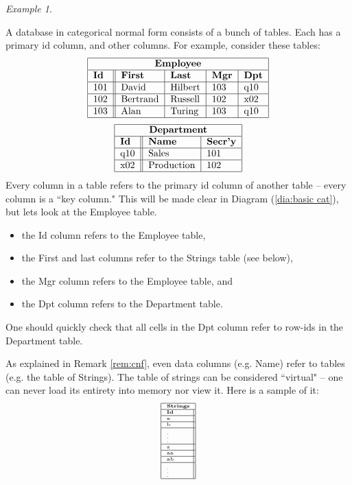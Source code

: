 \documentclass{amsart}
\theoremstyle{remark}
\newtheorem{example}[theorem]{Example}
\theoremstyle{definition}
\begin{document}
\begin{example}\label{ex:basic}

A database in categorical normal form consists of a bunch of tables.  Each has a primary id column, and other columns.  For example, consider these tables: \begin{align}\label{dia:flb}\begin{tabular}{| l || l | l | l | l |}\hline\multicolumn{5}{| c |}{\bf Employee}\\\hline {\bf Id}&{\bf First}&{\bf Last}&{\bf Mgr}&{\bf Dpt}\\\hline 101&David&Hilbert&103&q10\\\hline 102&Bertrand&Russell&102&x02\\\hline 103&Alan&Turing&103&q10\\\hline\end{tabular}\end{align} $$\begin{tabular}{| l || l | l |}\hline\multicolumn{3}{| c |}{\bf Department}\\\hline {\bf Id}&{\bf Name}&{\bf Secr'y}\\\hline q10&Sales&101\\\hline x02&Production&102\\\hline\end{tabular}$$   Every column in a table refers to the primary id column of another table -- every column is a ``key column."  This will be made clear in Diagram (\ref{dia:basic cat}), but lets look at the Employee table.  \begin{itemize}\item the Id column refers to the Employee table, \item the First and last columns refer to the Strings table (see below), \item the Mgr column refers to the Employee table, and \item the Dpt column refers to the Department table.\end{itemize}  One should quickly check that all cells in the Dpt column refer to row-ids in the Department table.

As explained in Remark \ref{rem:cnf}, even data columns (e.g. Name) refer to tables (e.g. the table of Strings).  The table of strings can be considered ``virtual" -- one can never load its entirety into memory nor view it.  Here is a sample of it: $$\tiny\begin{tabular}{| l ||}\hline\multicolumn{1}{| c |}{\bf Strings}\\\hline{\bf Id}\\\hline a\\\hline b\\\hline\vdots\\\hline z\\\hline aa\\\hline ab\\\hline\vdots\\\hline\end{tabular}$$\normalsize  


\end{example}
\end{document}

